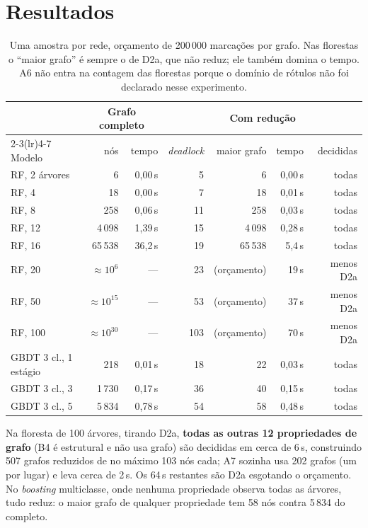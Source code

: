 \documentclass[11pt,a4paper]{report}
\theoremstyle{definition}
\begin{document}
\chapter{Resultados}
\label{cap:resultados}

\begin{table}[ht]
\centering\small
\setlength{\tabcolsep}{4.5pt}
\begin{tabular}{lrrrrrr}
\toprule
& \multicolumn{2}{c}{Grafo completo} & \multicolumn{4}{c}{Com redução} \\
\cmidrule(lr){2-3}\cmidrule(lr){4-7}
Modelo & nós & tempo & \emph{deadlock} & maior grafo & tempo & decididas \\
\midrule
RF, 2 árvores & 6 & 0{,}00\,s & 5 & 6 & 0{,}00\,s & todas \\
RF, 4 & 18 & 0{,}00\,s & 7 & 18 & 0{,}01\,s & todas \\
RF, 8 & 258 & 0{,}06\,s & 11 & 258 & 0{,}03\,s & todas \\
RF, 12 & 4\,098 & 1{,}39\,s & 15 & 4\,098 & 0{,}28\,s & todas \\
RF, 16 & 65\,538 & 36{,}2\,s & 19 & 65\,538 & 5{,}4\,s & todas \\
RF, 20 & $\approx10^{6}$ & --- & 23 & (orçamento) & 19\,s & menos D2a \\
RF, 50 & $\approx10^{15}$ & --- & 53 & (orçamento) & 37\,s & menos D2a \\
RF, 100 & $\approx10^{30}$ & --- & 103 & (orçamento) & 70\,s & menos D2a \\
\midrule
GBDT 3 cl., 1 estágio & 218 & 0{,}01\,s & 18 & 22 & 0{,}03\,s & todas \\
GBDT 3 cl., 3 & 1\,730 & 0{,}17\,s & 36 & 40 & 0{,}15\,s & todas \\
GBDT 3 cl., 5 & 5\,834 & 0{,}78\,s & 54 & 58 & 0{,}48\,s & todas \\
\bottomrule
\end{tabular}
\caption{Uma amostra por rede, orçamento de 200\,000 marcações por grafo. Nas
florestas o ``maior grafo'' é sempre o de D2a, que não reduz; ele também
domina o tempo. A6 não entra na contagem das florestas porque o domínio de
rótulos não foi declarado nesse experimento.}
\label{tab:resultados}
\end{table}

Na floresta de 100 árvores, tirando D2a, \textbf{todas as outras 12
propriedades de grafo} (B4 é estrutural e não usa grafo) são decididas em
cerca de 6\,s, construindo 507 grafos
reduzidos de no máximo 103 nós cada; A7 sozinha usa 202 grafos (um por
lugar) e leva cerca de 2\,s. Os 64\,s restantes são D2a esgotando o orçamento.
No \emph{boosting} multiclasse, onde nenhuma propriedade observa todas as
árvores, tudo reduz: o maior grafo de qualquer propriedade tem 58 nós contra
5\,834 do completo.
\end{document}

